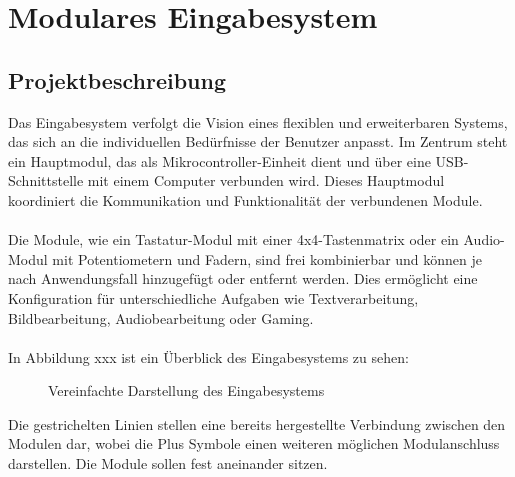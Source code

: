 \chapter{Modulares Eingabesystem}
\section{Projektbeschreibung}\label{sec:vision}
Das Eingabesystem verfolgt die Vision eines flexiblen und erweiterbaren Systems, das sich an die individuellen Bedürfnisse der Benutzer anpasst. Im Zentrum steht ein Hauptmodul, das als Mikrocontroller-Einheit dient und über eine USB-Schnittstelle mit einem Computer verbunden wird. Dieses Hauptmodul koordiniert die Kommunikation und Funktionalität der verbundenen Module.
\\
\\
Die Module, wie ein Tastatur-Modul mit einer 4x4-Tastenmatrix oder ein Audio-Modul mit Potentiometern und Fadern, sind frei kombinierbar und können je nach Anwendungsfall hinzugefügt oder entfernt werden. Dies ermöglicht eine Konfiguration für unterschiedliche Aufgaben wie Textverarbeitung, Bildbearbeitung, Audiobearbeitung oder Gaming.
\\
\\
In Abbildung xxx ist ein Überblick des Eingabesystems zu sehen:
\begin{figure}[H]
    \centering    
    \caption{Vereinfachte Darstellung des Eingabesystems}
    \label{vision}
\end{figure}
\noindent Die gestrichelten Linien stellen eine bereits hergestellte Verbindung zwischen den Modulen dar, wobei die \glqq Plus\grqq{} Symbole einen weiteren möglichen Modulanschluss darstellen. Die Module sollen fest aneinander sitzen.

